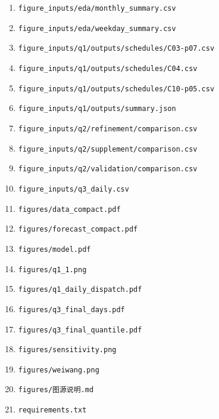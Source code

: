 \begin{enumerate}[label=\arabic*.,leftmargin=2.5em,itemsep=2pt]
\item \texttt{figure\_\allowbreak{}inputs/\allowbreak{}eda/\allowbreak{}monthly\_\allowbreak{}summary.csv}
\item \texttt{figure\_\allowbreak{}inputs/\allowbreak{}eda/\allowbreak{}weekday\_\allowbreak{}summary.csv}
\item \texttt{figure\_\allowbreak{}inputs/\allowbreak{}q1/\allowbreak{}outputs/\allowbreak{}schedules/\allowbreak{}C03-p07.csv}
\item \texttt{figure\_\allowbreak{}inputs/\allowbreak{}q1/\allowbreak{}outputs/\allowbreak{}schedules/\allowbreak{}C04.csv}
\item \texttt{figure\_\allowbreak{}inputs/\allowbreak{}q1/\allowbreak{}outputs/\allowbreak{}schedules/\allowbreak{}C10-p05.csv}
\item \texttt{figure\_\allowbreak{}inputs/\allowbreak{}q1/\allowbreak{}outputs/\allowbreak{}summary.json}
\item \texttt{figure\_\allowbreak{}inputs/\allowbreak{}q2/\allowbreak{}refinement/\allowbreak{}comparison.csv}
\item \texttt{figure\_\allowbreak{}inputs/\allowbreak{}q2/\allowbreak{}supplement/\allowbreak{}comparison.csv}
\item \texttt{figure\_\allowbreak{}inputs/\allowbreak{}q2/\allowbreak{}validation/\allowbreak{}comparison.csv}
\item \texttt{figure\_\allowbreak{}inputs/\allowbreak{}q3\_\allowbreak{}daily.csv}
\item \texttt{figures/\allowbreak{}data\_\allowbreak{}compact.pdf}
\item \texttt{figures/\allowbreak{}forecast\_\allowbreak{}compact.pdf}
\item \texttt{figures/\allowbreak{}model.pdf}
\item \texttt{figures/\allowbreak{}q1\_\allowbreak{}1.png}
\item \texttt{figures/\allowbreak{}q1\_\allowbreak{}daily\_\allowbreak{}dispatch.pdf}
\item \texttt{figures/\allowbreak{}q3\_\allowbreak{}final\_\allowbreak{}days.pdf}
\item \texttt{figures/\allowbreak{}q3\_\allowbreak{}final\_\allowbreak{}quantile.pdf}
\item \texttt{figures/\allowbreak{}sensitivity.png}
\item \texttt{figures/\allowbreak{}weiwang.png}
\item \texttt{figures/\allowbreak{}图源说明.md}
\item \texttt{requirements.txt}

\end{enumerate}
